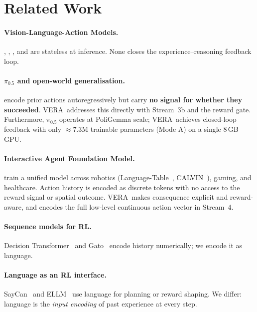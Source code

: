 \documentclass{article}
\newcommand{\modelname}{\textsc{VERA}\xspace}
\begin{document}
\section{Related Work}
\label{sec:related}

\paragraph{Vision-Language-Action Models.}
\citet{brohan2023rt2}, \citet{octo2024}, \citet{kim2024openvla},
and \citet{black2024pi0} are stateless at inference.
None closes the experience--reasoning feedback loop.

\paragraph{$\pi_{0.5}$ and open-world generalisation.}
\citet{hejna2025pi05} encode prior actions autoregressively
but carry \textbf{no signal for whether they succeeded}.
\modelname\ addresses this directly with Stream~3b and the reward gate.
Furthermore, $\pi_{0.5}$ operates at PoliGemma scale;
\modelname\ achieves closed-loop feedback with only ${\approx}7.3$M
trainable parameters (Mode A) on a single 8\,GB GPU.

\paragraph{Interactive Agent Foundation Model.}
\citet{durante2024agent} train a unified model across
robotics (Language-Table~\citep{lynch2023languagetable},
CALVIN~\citep{mees2022calvin}), gaming, and healthcare.
Action history is encoded as discrete tokens with no access to the reward
signal or spatial outcome.
\modelname\ makes consequence explicit and reward-aware, and
encodes the full low-level continuous action vector in Stream~4.

\paragraph{Sequence models for RL.}
Decision Transformer~\citep{chen2021decision} and Gato~\citep{reed2022gato}
encode history numerically; we encode it as language.

\paragraph{Language as an RL interface.}
SayCan~\citep{ahn2022saycan} and ELLM~\citep{du2023ellm} use language for
planning or reward shaping.
We differ: language is the \emph{input encoding} of past experience at
every step.
\end{document}

